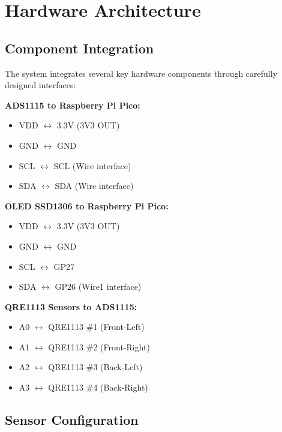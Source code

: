 \documentclass[12pt,a4paper]{article}
\begin{document}
\section{Hardware Architecture}

\subsection{Component Integration}

The system integrates several key hardware components through carefully designed interfaces:

\begin{tcolorbox}[colback=blue!5!white,colframe=blue!75!black,title=Hardware Connection Diagram]
\textbf{ADS1115 to Raspberry Pi Pico:}
\begin{itemize}
    \item VDD $\leftrightarrow$ 3.3V (3V3 OUT)
    \item GND $\leftrightarrow$ GND  
    \item SCL $\leftrightarrow$ SCL (Wire interface)
    \item SDA $\leftrightarrow$ SDA (Wire interface)
\end{itemize}

\textbf{OLED SSD1306 to Raspberry Pi Pico:}
\begin{itemize}
    \item VDD $\leftrightarrow$ 3.3V (3V3 OUT)
    \item GND $\leftrightarrow$ GND
    \item SCL $\leftrightarrow$ GP27
    \item SDA $\leftrightarrow$ GP26 (Wire1 interface)
\end{itemize}

\textbf{QRE1113 Sensors to ADS1115:}
\begin{itemize}
    \item A0 $\leftrightarrow$ QRE1113 \#1 (Front-Left)
    \item A1 $\leftrightarrow$ QRE1113 \#2 (Front-Right)
    \item A2 $\leftrightarrow$ QRE1113 \#3 (Back-Left)
    \item A3 $\leftrightarrow$ QRE1113 \#4 (Back-Right)
\end{itemize}
\end{tcolorbox}

\subsection{Sensor Configuration}
\end{document}
